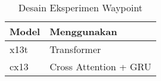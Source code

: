 

\setcounter{chapter}{4}
\setcounter{section}{0} %
\renewcommand{\thesection}{\thechapter.\arabic{section}}
\begin{table}[]
    \centering
    \caption{Desain Eksperimen Waypoint}
    \label{tab:waypoint-desain-eksperimen}
    \begin{tabular}{ll}
    \toprule
    \textbf{Model} & \textbf{Menggunakan} \\
    \midrule
    x13t & Transformer \\
    cx13 & Cross Attention + GRU \\
    \bottomrule
    \end{tabular}
\end{table}